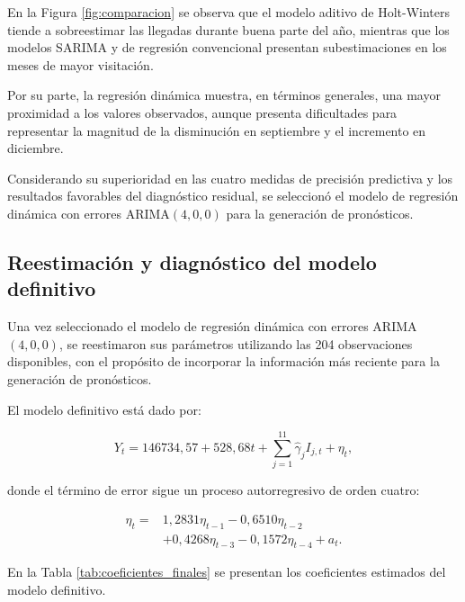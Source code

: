 \documentclass[12pt]{article}
\begin{document}
En la Figura \ref{fig:comparacion} se observa que el 
modelo aditivo de Holt-Winters tiende a sobreestimar 
las llegadas durante buena parte del año, mientras que 
los modelos SARIMA y de regresión convencional presentan 
subestimaciones en los meses de mayor visitación.

Por su parte, la regresión dinámica muestra, en términos 
generales, una mayor proximidad a los valores observados, 
aunque presenta dificultades para representar la magnitud 
de la disminución en septiembre y el incremento en 
diciembre.

Considerando su superioridad en las cuatro medidas de 
precisión predictiva y los resultados favorables del 
diagnóstico residual, se seleccionó el modelo de 
regresión dinámica con errores ARIMA$(4,0,0)$ para 
la generación de pronósticos.

\subsection{Reestimación y diagnóstico del modelo definitivo}

Una vez seleccionado el modelo de regresión dinámica 
con errores ARIMA$(4,0,0)$, se reestimaron sus parámetros 
utilizando las 204 observaciones disponibles, con el 
propósito de incorporar la información más reciente 
para la generación de pronósticos.

El modelo definitivo está dado por:

\begin{equation}
Y_t=146734{,}57+528{,}68t+
\sum_{j=1}^{11}\widehat{\gamma}_j I_{j,t}+\eta_t,
\label{eq:modelo_definitivo}
\end{equation}

donde el término de error sigue un proceso 
autorregresivo de orden cuatro:

\begin{equation}
\begin{aligned}
\eta_t={}&1{,}2831\eta_{t-1}
-0{,}6510\eta_{t-2}\\
&+0{,}4268\eta_{t-3}
-0{,}1572\eta_{t-4}+a_t.
\end{aligned}
\label{eq:ar4_definitivo}
\end{equation}

En la Tabla \ref{tab:coeficientes_finales} se presentan 
los coeficientes estimados del modelo definitivo.
\end{document}
